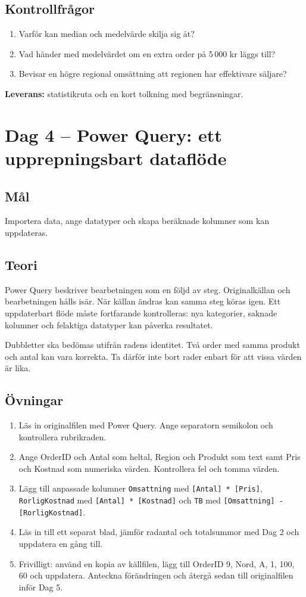 \documentclass[11pt,a4paper]{article}
\newcommand{\dag}[2]{\clearpage\section{Dag #1 -- #2}}
\begin{document}
\subsection*{Kontrollfrågor}
\begin{enumerate}
\item Varför kan median och medelvärde skilja sig åt?
\item Vad händer med medelvärdet om en extra order på 5\,000 kr läggs till?
\item Bevisar en högre regional omsättning att regionen har effektivare säljare?
\end{enumerate}
\textbf{Leverans:} statistikruta och en kort tolkning med begränsningar.

\dag{4}{Power Query: ett upprepningsbart dataflöde}
\subsection*{Mål}
Importera data, ange datatyper och skapa beräknade kolumner som kan uppdateras.
\subsection*{Teori}
Power Query beskriver bearbetningen som en följd av steg. Originalkällan och bearbetningen hålls isär. När källan ändras kan samma steg köras igen. Ett uppdaterbart flöde måste fortfarande kontrolleras: nya kategorier, saknade kolumner och felaktiga datatyper kan påverka resultatet.

Dubbletter ska bedömas utifrån radens identitet. Två order med samma produkt och antal kan vara korrekta. Ta därför inte bort rader enbart för att vissa värden är lika.
\subsection*{Övningar}
\begin{enumerate}
\item Läs in originalfilen med Power Query. Ange separatorn semikolon och kontrollera rubrikraden.
\item Ange OrderID och Antal som heltal, Region och Produkt som text samt Pris och Kostnad som numeriska värden. Kontrollera fel och tomma värden.
\item Lägg till anpassade kolumner \texttt{Omsattning} med \texttt{[Antal] * [Pris]}, \texttt{RorligKostnad} med \texttt{[Antal] * [Kostnad]} och \texttt{TB} med \texttt{[Omsattning] - [RorligKostnad]}.
\item Läs in till ett separat blad, jämför radantal och totalsummor med Dag 2 och uppdatera en gång till.
\item Frivilligt: använd en kopia av källfilen, lägg till OrderID 9, Nord, A, 1, 100, 60 och uppdatera. Anteckna förändringen och återgå sedan till originalfilen inför Dag 5.
\end{enumerate}
\end{document}

